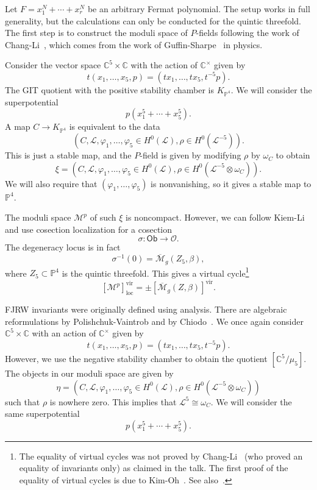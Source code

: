 \documentclass[10pt,oldfontcommands,oneside]{memoir}
\theoremstyle{definition}
\theoremstyle{remark}
\theoremstyle{plain}
\theoremstyle{definition}
\theoremstyle{remark}
\newcommand{\C}{\mathbb{C}}
\renewcommand{\P}{\mathbb{P}}
\newcommand{\M}{\mathcal{M}}
\newcommand{\Mbar}{\overline{\mathcal{M}}}
\newcommand{\mc}[1]{\mathcal{#1}}
\newcommand{\mr}[1]{\mathrm{#1}}
\newcommand{\ms}[1]{\mathsf{#1}}
\newcommand{\1}{\mathbf{1}}
\newcommand{\2}{\mathbf{2}}
\newcommand{\3}{\mathbf{3}}
\newcommand{\vir}{\mr{vir}}
\begin{document}
Let $F = x_1^N + \cdots + x_r^N$ be an arbitrary Fermat polynomial. The setup works in full generality, but the calculations can only be conducted for the quintic threefold. The first step is to construct the moduli space of $P$-fields following the work of Chang-Li~\cite{pfieldschangli}, which comes from the work of Guffin-Sharpe~\cite{guffin} in physics.

Consider the vector space $\C^5 \times \C$ with the action of $\C^{\times}$ given by
\[ t(x_1, \ldots, x_5, p) = (t x_1, \ldots, t x_5, t^{-5}p). \]
The GIT quotient with the positive stability chamber is $K_{\P^4}$. We will consider the superpotential
\[ p (x_1^5 + \cdots + x_5^5). \]
A map $C \to K_{\P^4}$ is equivalent to the data
\[ (C, \mc{L}, \varphi_1, \ldots, \varphi_5 \in H^0(\mc{L}), \rho \in H^0( \mc{L}^{-5} )). \]
This is just a stable map, and the $P$-field is given by modifying $\rho$ by $\omega_C$ to obtain
\[ \xi = (C, \mc{L}, \varphi_1, \ldots, \varphi_5 \in H^0(\mc{L}), \rho \in H^0( \mc{L}^{-5}\otimes \omega_C )). \]
We will also require that $(\varphi_1, \ldots, \varphi_5)$ is nonvanishing, so it gives a stable map to $\P^4$.

The moduli space $\M^p$ of such $\xi$ is noncompact. However, we can follow Kiem-Li~\cite{cosection} and use cosection localization for a cosection
\[ \sigma \colon \ms{Ob} \to \mc{O}. \]
The degeneracy locus is in fact
\[ \sigma^{-1}(0) = \Mbar_g(Z_5,\beta), \]
where $Z_5 \subset \P^4$ is the quintic threefold.
This gives a virtual cycle\footnote{The equality of virtual cycles was not proved by Chang-Li~\cite{pfieldschangli} (who proved an equality of invariants only) as claimed in the talk. The first proof of the equality of virtual cycles is due to Kim-Oh~\cite{localizedchern}. See also~\cite{clqmap}.}
\[ [\M^p]^{\vir}_{\mr{loc}} = \pm [\Mbar_g(Z,\beta)]^{\vir}. \]


FJRW invariants were originally defined using analysis. There are algebraic reformulations by Polishchuk-Vaintrob and by Chiodo~\cite{mfcohftFJRW,wittenkthy}. We once again consider $\C^5 \times \C$ with an action of $\C^{\times}$ given by
\[ t(x_1, \ldots, x_5, p) = (t x_1, \ldots, t x_5, t^{-5}p). \]
However, we use the negative stability chamber to obtain the quotient $[\C^5/\mu_5]$. The objects in our moduli space are given by
\[ \eta = (C, \mc{L}, \varphi_1, \ldots, \varphi_5 \in H^0(\mc{L}), \rho \in H^0( \mc{L}^{-5}\otimes \omega_C )) \]
such that $\rho$ is nowhere zero. This implies that $\mc{L}^5 \cong \omega_C$. We will consider the same superpotential
\[ p(x_1^5 + \cdots + x_5^5). \]
\end{document}
